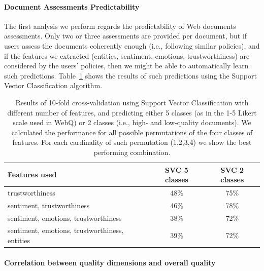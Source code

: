 \documentclass{llncs}
\begin{document}
\paragraph{Document Assessments Predictability}
The first analysis we perform regards the predictability of Web documents assessments. Only two or three assessments are provided per document, but if users assess the documents coherently enough (i.e., following similar policies), and if the features we extracted (entities, sentiment, emotions, trustworthiness) are considered by the users' policies, then we might be able to automatically learn such predictions.
Table~\ref{tab:predj} shows the results of such predictions using the Support Vector Classification algorithm.
\begin{table}
\centering
\caption{Results of 10-fold cross-validation using Support Vector Classification with different number of features, and predicting either 5 classes (as in the 1-5 Likert scale used in WebQ) or 2 classes (i.e., high- and low-quality documents). We calculated the performance for all possible permutations of the four classes of features. For each cardinality of such permutation (1,2,3,4) we show the best performing combination.\label{tab:predj}}
\begin{tabular}{|l|c|c|}
\hline
{\bf Features used} & {\bf SVC 5 classes} & {\bf SVC 2 classes}\\
\hline
trustworthiness & 48\% & 75\%\\
\hline
sentiment, trustworthiness & 46\% & 78\%\\
\hline
sentiment, emotions, trustworthiness & 38\% & 72\%\\
\hline
sentiment, emotions, trustworthiness, entities & 39\% & 72\%\\
\hline
\end{tabular}
\end{table}

\paragraph{Correlation between quality dimensions and overall quality}
\end{document}
